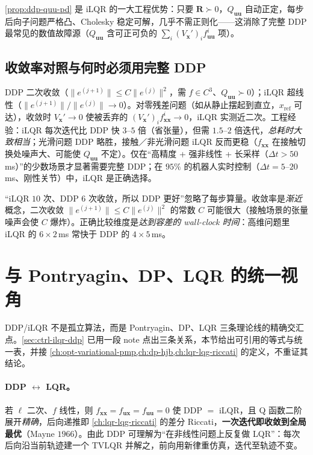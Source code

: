 \cref{prop:ddp-quu-pd} 是 iLQR 的一大工程优势：只要 $\mathbf{R}\succ0$，$Q_{\mathbf{uu}}$ 自动正定，每步后向子问题严格凸、Cholesky 稳定可解，几乎不需正则化——这消除了完整 DDP 最常见的数值故障源（$Q_{\mathbf{uu}}$ 含可正可负的 $\sum_i(V_{\mathbf{x}}')_i f^i_{\mathbf{uu}}$ 项）。

\subsection{收敛率对照与何时必须用完整 DDP}
\label{sec:ddp-gn-rate}

DDP 二次收敛（$\|e^{(j+1)}\|\le C\|e^{(j)}\|^2$，需 $f\in C^3$、$Q_{\mathbf{uu}}\succ0$）；iLQR 超线性（$\|e^{(j+1)}\|/\|e^{(j)}\|\to0$）。对零残差问题（如从静止摆起到直立，$x_{\mathrm{ref}}$ 可达），收敛时 $V_{\mathbf{x}}'\to0$ 使被丢弃的 $(V_{\mathbf{x}}')_i f^i_{\mathbf{xx}}\to0$，iLQR 实测近二次。工程经验：iLQR 每次迭代比 DDP 快 $3$--$5$ 倍（省张量），但需 $1.5$--$2$ 倍迭代，\emph{总耗时大致相当}；光滑问题 DDP 略胜，接触／非光滑问题 iLQR 反而更稳（$f_{\mathbf{xx}}$ 在接触切换处噪声大、可能使 $Q_{\mathbf{uu}}$ 不定）。仅在“高精度 + 强非线性 + 长采样（$\Delta t>50$\,ms）”的少数场景才显著需要完整 DDP；在 $95\%$ 的机器人实时控制（$\Delta t=5$--$20$\,ms、刚性关节）中，iLQR 是正确选择。

\begin{pitfall}[二次收敛未必优于超线性]
“iLQR $10$ 次、DDP $6$ 次收敛，所以 DDP 更好”忽略了每步算量。收敛率是\emph{渐近}概念，二次收敛 $\|e^{(j+1)}\|\le C\|e^{(j)}\|^2$ 的常数 $C$ 可能很大（接触场景的张量噪声会使 $C$ 爆炸）。正确比较维度是\emph{达到容差的 wall-clock 时间}：高维问题里 iLQR 的 $6\times2$\,ms 常快于 DDP 的 $4\times5$\,ms。
\end{pitfall}

\section{与 Pontryagin、DP、LQR 的统一视角}
\label{sec:ddp-unify}

DDP/iLQR 不是孤立算法，而是 Pontryagin、DP、LQR 三条理论线的精确交汇点。\cref{sec:ctrl-ilqr-ddp} 已用一段 note 点出三条关系，本节给出可引用的等式与统一表，并接 \cref{ch:opt-variational-pmp,ch:dp-hjb,ch:lqr-lqg-riccati} 的定义，不重证其结论。

\paragraph{DDP $\leftrightarrow$ LQR。}\;
若 $\ell$ 二次、$f$ 线性，则 $f_{\mathbf{xx}}=f_{\mathbf{ux}}=f_{\mathbf{uu}}=0$ 使 DDP $=$ iLQR，且 Q 函数二阶展开\emph{精确}，后向递推即 \cref{ch:lqr-lqg-riccati} 的差分 Riccati，\textbf{一次迭代即收敛到全局最优}（Mayne $1966$\cite{mayne1966ddp}）。由此 DDP 可理解为“在非线性问题上反复做 LQR”：每次后向沿当前轨迹建一个 TVLQR 并解之，前向用新律重仿真，迭代至轨迹不变。

